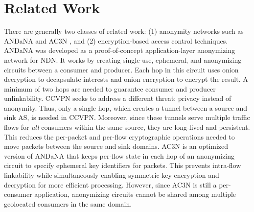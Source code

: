 \section{Related Work} \label{sec:related}
There are generally two classes of related work: (1) anonymity networks such
as ANDaNA \cite{dibenedetto2011andana} and AC3N \cite{tsudik2016ac3n}, and
(2) encryption-based access control techniques. ANDaNA was developed as a
proof-of-concept application-layer anonymizing network for NDN. It works by
creating single-use, ephemeral, and anonymizing circuits between a consumer
and producer. Each hop in this circuit uses onion decryption to decapsulate
interests and onion encryption to encrypt the result. A minimum of two hops are 
needed to guarantee consumer and producer unlinkability. CCVPN seeks to address
a different threat: privacy instead of anonymity. Thus, only a single hop, which
creates a tunnel between a source and sink AS, is needed in CCVPN. Moreover,
since these tunnels serve multiple traffic flows for \emph{all} consumers within 
the same source, they are long-lived and persistent. This reduces the per-packet
and per-flow cryptographic operations needed to move packets between the source
and sink domains. AC3N \cite{tsudik2016ac3n} is an optimized version of ANDaNA
that keeps per-flow state in each hop of an anonymizing circuit to specify 
ephemeral key identifiers for packets. This prevents intra-flow linkability
while simultaneously enabling symmetric-key encryption and decryption for more
efficient processing. However, since AC3N is still a per-consumer application,
anonymizing circuits cannot be shared among multiple geolocated consumers
in the same domain. 

